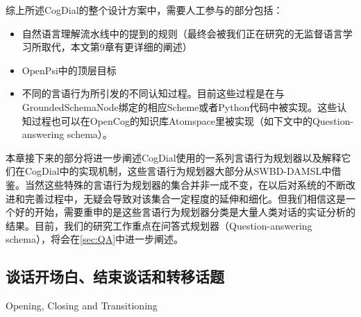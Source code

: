 综上所述CogDial的整个设计方案中，需要人工参与的部分包括：
\begin{itemize}
\item 自然语言理解流水线中的提到的规则（最终会被我们正在研究的无监督语言学习所取代，本文第9章有更详细的阐述）
\item OpenPsi中的顶层目标
\item 不同的言语行为所引发的不同认知过程。目前这些过程是在与GroundedSchemaNode绑定的相应Scheme或者Python代码中被实现。这些认知过程也可以在OpenCog的知识库Atomspace里被实现（如下文中的Question-answering schema）。
\end{itemize}
本章接下来的部分将进一步阐述CogDial使用的一系列言语行为规划器以及解释它们在CogDial中的实现机制，这些言语行为规划器大部分从SWBD-DAMSL中借鉴。当然这些特殊的言语行为规划器的集合并非一成不变，在以后对系统的不断改进和完善过程中，无疑会导致对该集合一定程度的延伸和细化。但我们相信这是一个好的开始，需要重申的是这些言语行为规划器分类是大量人类对话的实证分析的结果。目前，我们的研究工作重点在问答式规划器（Question-answering schema），将会在\ref{sec:QA}中进一步阐述。

\subsection{谈话开场白、结束谈话和转移话题}{Opening, Closing and Transitioning}

